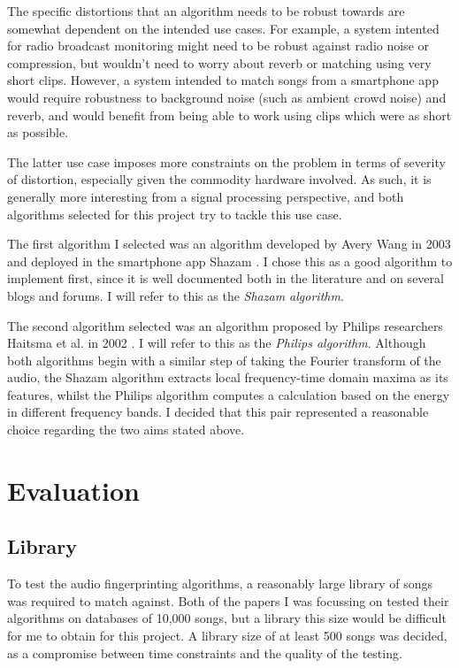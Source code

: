 \documentclass[12pt,a4paper,twoside,openright]{report}
\begin{document}
The specific distortions that an algorithm needs to be robust towards are somewhat dependent on the intended use cases. For example, a system intented for radio broadcast monitoring might need to be robust against radio noise or compression, but wouldn't need to worry about reverb or matching using very short clips. However, a system intended to match songs from a smartphone app would require robustness to background noise (such as ambient crowd noise) and reverb, and would benefit from being able to work using clips which were as short as possible.

The latter use case imposes more constraints on the problem in terms of severity of distortion, especially given the commodity hardware involved. As such, it is generally more interesting from a signal processing perspective, and both algorithms selected for this project try to tackle this use case.

The first algorithm I selected was an algorithm developed by Avery Wang in 2003 and deployed in the smartphone app Shazam \cite{Wang03}. I chose this as a good algorithm to implement first, since it is well documented both in the literature and on several blogs and forums. I will refer to this as the \textit{Shazam algorithm}.

The second algorithm selected was an algorithm proposed by Philips researchers Haitsma et al. in 2002 \cite{Haitsma02}. I will refer to this as the \textit{Philips algorithm}. Although both algorithms begin with a similar step of taking the Fourier transform of the audio, the Shazam algorithm extracts local frequency-time domain maxima as its features, whilst the Philips algorithm computes a calculation based on the energy in different frequency bands. I decided that this pair represented a reasonable choice regarding the two aims stated above.


\section{Evaluation}

\subsection{Library}

To test the audio fingerprinting algorithms, a reasonably large library of songs was required to match against. Both of the papers I was focussing on tested their algorithms on databases of 10,000 songs, but a library this size would be difficult for me to obtain for this project. A library size of at least 500 songs was decided, as a compromise between time constraints and the quality of the testing.
\end{document}
